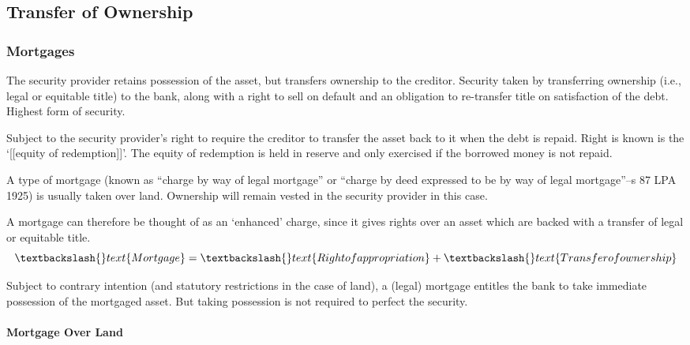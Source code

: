 \documentclass[
]{article}
\newenvironment{Shaded}{}{}
\newcommand{\NormalTok}[1]{#1}
\begin{document}
\hypertarget{transfer-of-ownership}{%
\subsection{Transfer of Ownership}\label{transfer-of-ownership}}

\hypertarget{mortgages}{%
\subsubsection{Mortgages}\label{mortgages}}

The security provider retains possession of the asset, but transfers
ownership to the creditor. Security taken by transferring ownership
(i.e., legal or equitable title) to the bank, along with a right to sell
on default and an obligation to re-transfer title on satisfaction of the
debt. Highest form of security.

Subject to the security provider's right to require the creditor to
transfer the asset back to it when the debt is repaid. Right is known is
the `{[}{[}equity of redemption{]}{]}'. The equity of redemption is held
in reserve and only exercised if the borrowed money is not repaid.

A type of mortgage (known as ``charge by way of legal mortgage'' or
``charge by deed expressed to be by way of legal mortgage''--s 87 LPA
1925) is usually taken over land. Ownership will remain vested in the
security provider in this case.

\begin{Shaded}
\begin{Highlighting}[]
\NormalTok{A mortgage can therefore be thought of as an ‘enhanced’ charge, since it gives rights over an asset which are backed with a transfer of legal or equitable title.}
\NormalTok{$$\textbackslash{}text\{Mortgage\} = \textbackslash{}text\{Right of appropriation\} + \textbackslash{}text\{Transfer of ownership\}$$}
\end{Highlighting}
\end{Shaded}

Subject to contrary intention (and statutory restrictions in the case of
land), a (legal) mortgage entitles the bank to take immediate possession
of the mortgaged asset. But taking possession is not required to perfect
the security.

\hypertarget{mortgage-over-land}{%
\paragraph{Mortgage Over Land}\label{mortgage-over-land}}
\end{document}
